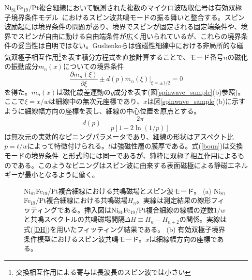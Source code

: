 Ni$_{81}$Fe$_{19}$/Pt複合細線において観測された複数のマイクロ波吸収信号は有効双極子境界条件モデル~\cite{Guslienko}におけるスピン波共鳴モードの振る舞いと整合する。スピン波励起には境界条件の問題があり、境界でスピンが固定される固定端条件や、境界でスピンが自由に動ける自由端条件が広く用いられているが、これらの境界条件の妥当性は自明ではない\cite{Gurevich}。Guslienkoらは強磁性細線中における非局所的な磁気双極子相互作用\footnote{交換相互作用による寄与は長波長のスピン波では小さい}を表す積分方程式を直接計算することで、モード番号$n$の磁化の振動成分$m_n(x)$についての境界条件
\begin{equation}
\frac{\partial m_n(\xi )}{\partial \xi}\pm d(p) m_n(\xi)|_{\xi=\pm1/2}=0\label{boun}
\end{equation}
を得た\cite{Guslienko}。$m_n(x)$は磁化歳差運動の$y$成分を表す(図\ref{spinwave_sample}(b)参照)。ここで$\xi=x/w$は細線中の無次元座標であり、$x$は図\ref{spinwave_sample}(b)に示すように細線幅方向の座標を表し、細線の中心位置を原点とする。
\begin{equation}
d(p)=\frac{2\pi}{p[1+2\ln (1/p)]}
\end{equation}
は無次元の実効的なピニングパラメータであり、細線の形状はアスペクト比$p=t/w$によって特徴付けられる。$t$は強磁性層の膜厚である。式(\ref{boun})は交換モードの境界条件~\cite{Gurevich}と形式的には同一であるが、純粋に双極子相互作用によるものである。このようなピニングはスピン波に由来する表面磁極による静磁エネルギーが最小となるように働く。


\begin{figure}[tbp]
 \begin{center}
 \end{center}
 \caption{Ni$_{81}$Fe$_{19}$/Pt複合細線における共鳴磁場とスピン波モード。
(a) Ni$_{81}$Fe$_{19}$/Pt複合細線における共鳴磁場$H_n$。実線は測定結果の線形フィッティングである。挿入図はNi$_{81}$Fe$_{19}$/Pt複合細線の線幅の逆数$1/w$と共鳴スペクトルの共鳴磁場間隔$\Delta H\equiv H_n-H_{n+2}$の関係。実線は式(\ref{DH})を用いたフィッティング結果である。
(b) 有効双極子境界条件模型におけるスピン波共鳴モード。$x$は細線幅方向の座標である。}
 \label{spinwave_resonancefield}
\end{figure}

